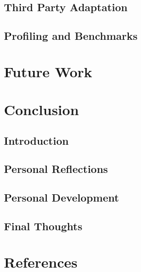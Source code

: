 \documentclass[12pt, a4paper]{article}
\begin{document}

\subsection{Third Party Adaptation}


\subsection{Profiling and Benchmarks}


\section{Future Work}


\section{Conclusion}


\subsection{Introduction}


\subsection{Personal Reflections}


\subsection{Personal Development}


\subsection{Final Thoughts}

\pagebreak


\section{References}


\end{document}

